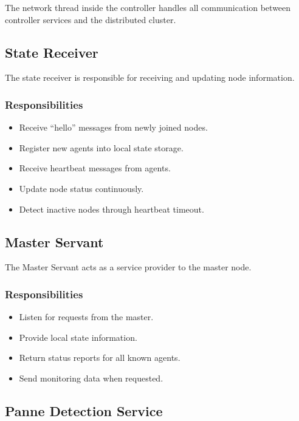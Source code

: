 \documentclass[12pt,a4paper]{article}
\begin{document}
The network thread inside the controller handles all communication between controller services and the distributed cluster.

\subsection{State Receiver}

The state receiver is responsible for receiving and updating node information.

\subsubsection{Responsibilities}

\begin{itemize}
    \item Receive ``hello'' messages from newly joined nodes.
    \item Register new agents into local state storage.
    \item Receive heartbeat messages from agents.
    \item Update node status continuously.
    \item Detect inactive nodes through heartbeat timeout.
\end{itemize}

\subsection{Master Servant}

The Master Servant acts as a service provider to the master node.

\subsubsection{Responsibilities}

\begin{itemize}
    \item Listen for requests from the master.
    \item Provide local state information.
    \item Return status reports for all known agents.
    \item Send monitoring data when requested.
\end{itemize}

\subsection{Panne Detection Service}
\end{document}
